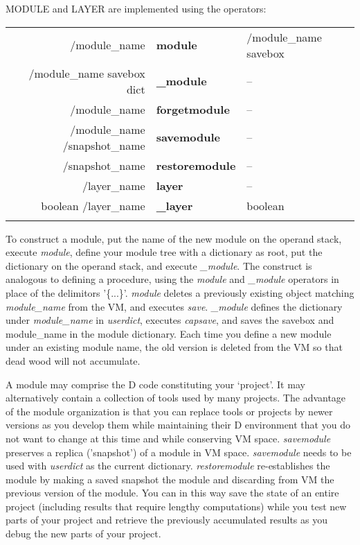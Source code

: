\noindent MODULE and LAYER are implemented using the operators:\\

\begin{tabular}{>{\sffamily}r>{\sffamily\bfseries}l>{\sffamily}l}
/module\_name & module & /module\_name savebox\\
/module\_name savebox dict & \_module & --\\
/module\_name & forgetmodule & --\\
/module\_name /snapshot\_name & savemodule & --\\
/snapshot\_name & restoremodule & --\\
/layer\_name & layer & --\\
boolean /layer\_name & \_layer & boolean\\\\
\end{tabular}



To construct a module, put the name of the new module on the operand stack, execute \emph{module}, define your module tree with a dictionary as root, put the dictionary on the operand stack, and execute \emph{\_module}. The construct is analogous to defining a procedure, using the \emph{module} and \emph{\_module} operators in place of the delimitors '\{...\}'. \emph{module} deletes a previously existing object matching \emph{module\_name} from the VM, and executes \emph{save}. \emph{\_module} defines the dictionary under \emph{module\_name} in \emph{userdict}, executes \emph{capsave}, and saves the savebox and module\_name in the module dictionary. Each time you define a new module under an existing module name, the old version is deleted from the VM so that dead wood will not accumulate.

A module may comprise the D code constituting your `project'. It may alternatively contain a collection of tools used by many projects. The advantage of the module organization is that you can replace tools or projects by newer versions as you develop them while maintaining their D environment that you do not want to change at this time and while conserving VM space. \emph{savemodule} preserves a replica ('snapshot') of a module in VM space. \emph{savemodule} needs to be used with \emph{userdict} as the current dictionary. \emph{restoremodule} re-establishes the module by making a saved snapshot the module and discarding from VM the previous version of the module. You can in this way save the state of an entire project (including results that require lengthy computations) while you test new parts of your project and retrieve the previously accumulated results as you debug the new parts of your project.

